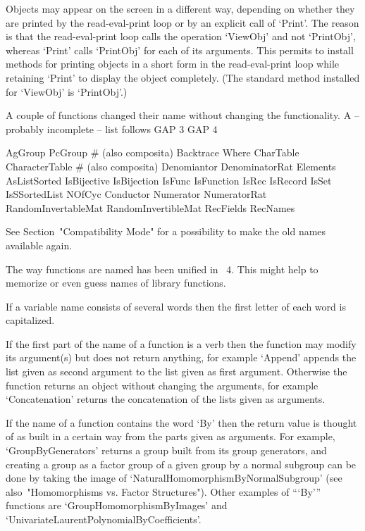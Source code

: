 Objects may appear on the screen in a different way,
depending on whether they are printed by the read-eval-print loop
or by an explicit call of `Print'.
The reason is that the read-eval-print loop calls the operation `ViewObj'
and not `PrintObj', whereas `Print' calls `PrintObj' for each of its
arguments.
This permits to  install methods for printing objects in a short form
in the read-eval-print loop while retaining `Print' to display
the object completely.
(The standard method installed for `ViewObj' is `PrintObj'.)



A couple of functions changed their name without changing the
functionality.
A -- probably incomplete -- list follows
\begintt
    GAP 3                   GAP 4

    AgGroup                 PcGroup            # (also composita)
    Backtrace               Where
    CharTable               CharacterTable     # (also composita)
    Denomiantor             DenominatorRat
    Elements                AsListSorted
    IsBijective             IsBijection
    IsFunc                  IsFunction
    IsRec                   IsRecord
    IsSet                   IsSSortedList
    NOfCyc                  Conductor
    Numerator               NumeratorRat
    RandomInvertableMat     RandomInvertibleMat
    RecFields               RecNames
\endtt

See Section~"Compatibility Mode" for a possibility to make the old names
available again.



The way functions are named has been unified in {\GAP}~4.
This might help to memorize or even guess names of library functions.

If a variable name consists of several words then the first
letter of each word is capitalized.

If the first part of the name of a function is a verb then the function
may modify its argument(s) but does not return anything,
for example `Append' appends the list given as second argument to the
list given as first argument.
Otherwise the function returns an object without changing the arguments,
for example `Concatenation' returns the concatenation of the lists
given as arguments.

If the name of a function contains the word `By' then the return value is
thought of as built in a certain way from the parts given as arguments.
For example, `GroupByGenerators' returns a group built from its group
generators, and creating a group as a factor group of a given group
by a normal subgroup can be done by taking the image of
`NaturalHomomorphismByNormalSubgroup'
(see also~"Homomorphisms vs. Factor Structures").
Other examples of ```By''' functions are `GroupHomomorphismByImages' and
`UnivariateLaurentPolynomialByCoefficients'.

